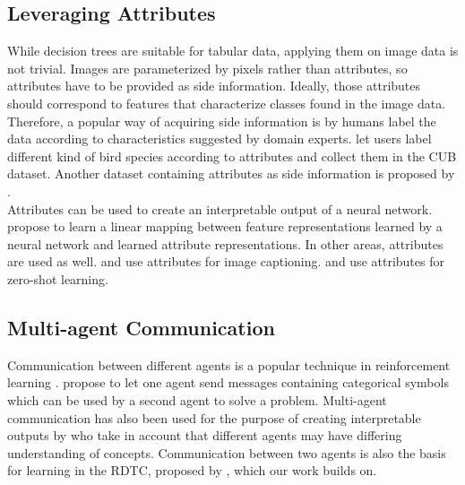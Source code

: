 \documentclass[a4paper,cleardoubleempty,BCOR1cm, 11pt]{report}
\begin{document}
\subsection{Leveraging Attributes}
While decision trees are suitable for tabular data, applying them on image data is not trivial. Images are parameterized by pixels rather than attributes, so attributes have to be provided as side information. Ideally, those attributes should correspond to features that characterize classes found in the image data. Therefore, a popular way of acquiring side information is by humans label the data according to characteristics suggested by domain experts. \citet{WahCUB_200_2011} let users label different kind of bird species according to attributes and collect them in the CUB dataset. Another dataset containing attributes as side information is proposed by \citet{8413121}.\\
Attributes can be used to create an interpretable output of a neural network. \citet{akata2013label} propose to learn a linear mapping between feature representations learned by a neural network and learned attribute representations.
In other areas, attributes are used as well. \citet{kulkarni2013babytalk} and \citet{ordonez2011im2text} use attributes for image captioning. \citet{lampert2009learning} and \citet{palatucci2009zero} use attributes for zero-shot learning.


\subsection{Multi-agent Communication}
Communication between different agents is a popular technique in reinforcement learning \cite{havrylov2017emergence, lazaridou2018emergence, cao2018emergent, jiang2018learning, das2019tarmac}. \citet{foerster2016learning} propose to let one agent send messages containing categorical symbols which can be used by a second agent to solve a problem. Multi-agent communication has also been used for the purpose of creating interpretable outputs by \citet{rodriguez2019modeling} who take in account that different agents may have differing understanding of concepts. Communication between two agents is also the basis for learning in the RDTC, proposed by \citet{alaniz2019explainable}, which our work builds on.
\end{document}
